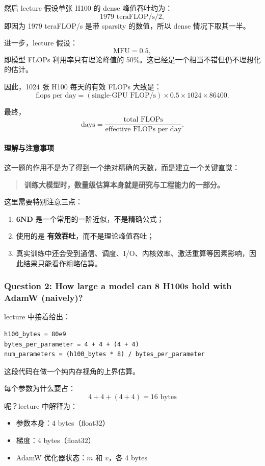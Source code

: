 \documentclass[a4paper,UTF8]{article}
\numberwithin{equation}{section}
\begin{document}
然后 lecture 假设单张 H100 的 dense 峰值吞吐约为：
\[
1979 \text{ teraFLOP/s} / 2,
\]
即因为 1979 teraFLOP/s 是带 sparsity 的数值，所以 dense 情况下取其一半。

进一步，lecture 假设：
\[
\mathrm{MFU} = 0.5,
\]
即模型 FLOPs 利用率只有理论峰值的 50\%。这已经是一个相当不错但仍不理想化的估计。

因此，1024 张 H100 每天的有效 FLOPs 大致是：
\[
\text{flops per day}
=
(\text{single-GPU FLOP/s})
\times 0.5
\times 1024
\times 86400.
\]

最终，
\[
\text{days}
=
\frac{\text{total FLOPs}}{\text{effective FLOPs per day}}.
\]

\paragraph{理解与注意事项}
这一题的作用不是为了得到一个绝对精确的天数，而是建立一个关键直觉：

\begin{quote}
\textbf{训练大模型时，数量级估算本身就是研究与工程能力的一部分。}
\end{quote}

这里需要特别注意三点：
\begin{enumerate}
    \item \(\mathbf{6ND}\) 是一个常用的一阶近似，不是精确公式；
    \item 使用的是 \textbf{有效吞吐}，而不是理论峰值吞吐；
    \item 真实训练中还会受到通信、调度、I/O、内核效率、激活重算等因素影响，因此结果只能看作粗略估算。
\end{enumerate}

\subsubsection{Question 2: How large a model can 8 H100s hold with AdamW (naively)?}

lecture 中接着给出：
\begin{verbatim}
h100_bytes = 80e9
bytes_per_parameter = 4 + 4 + (4 + 4)
num_parameters = (h100_bytes * 8) / bytes_per_parameter
\end{verbatim}

这段代码在做一个纯内存视角的上界估算。

每个参数为什么要占：
\[
4 + 4 + (4 + 4) = 16 \text{ bytes}
\]
呢？lecture 中解释为：
\begin{itemize}
    \item 参数本身：4 bytes（float32）
    \item 梯度：4 bytes（float32）
    \item AdamW 优化器状态：\(m\) 和 \(v\)，各 4 bytes
\end{itemize}
\end{document}
